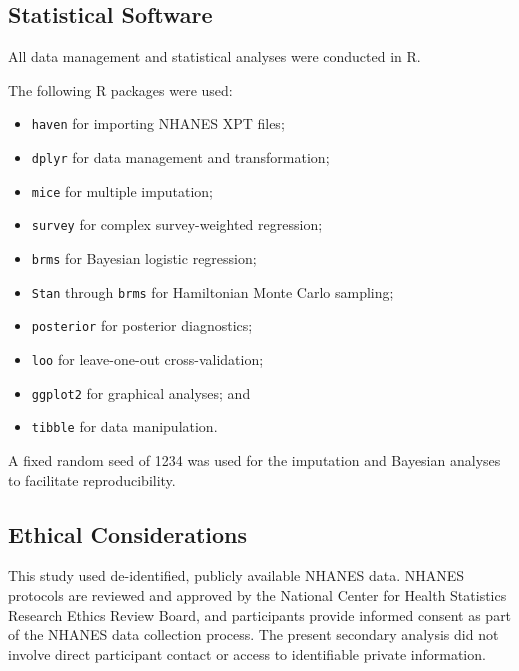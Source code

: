 \documentclass[12pt]{article}
\begin{document}
\subsection{Statistical Software}

All data management and statistical analyses were conducted in R.

The following R packages were used:

\begin{itemize}
    \item \texttt{haven} for importing NHANES XPT files;
    \item \texttt{dplyr} for data management and transformation;
    \item \texttt{mice} for multiple imputation;
    \item \texttt{survey} for complex survey-weighted regression;
    \item \texttt{brms} for Bayesian logistic regression;
    \item \texttt{Stan} through \texttt{brms} for Hamiltonian Monte Carlo sampling;
    \item \texttt{posterior} for posterior diagnostics;
    \item \texttt{loo} for leave-one-out cross-validation;
    \item \texttt{ggplot2} for graphical analyses; and
    \item \texttt{tibble} for data manipulation.
\end{itemize}

A fixed random seed of 1234 was used for the imputation and Bayesian analyses to facilitate reproducibility.


\subsection{Ethical Considerations}

This study used de-identified, publicly available NHANES data. NHANES protocols are reviewed and approved by the National Center for Health Statistics Research Ethics Review Board, and participants provide informed consent as part of the NHANES data collection process. The present secondary analysis did not involve direct participant contact or access to identifiable private information.

\end{document}
